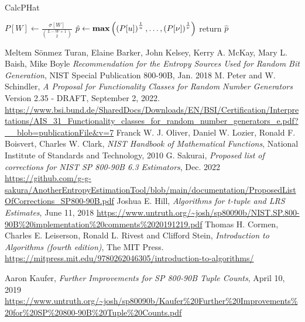 ﻿\documentclass[a3paper,xelatex,english]{bxjsarticle}
\newcommand\mib[1]{\boldsymbol{#1}}
\begin{document}
\begin{algorithm}
  \caption{CalcPHat}\label{alg:CalcPHat}
  \begin{algorithmic}[1]
    \Function{CalcPHat}{$\mib{\sigma}, u, \nu$}
			\State $\displaystyle P[W] \gets \frac{ \sigma[W] }{ \binom{L - W + 1}{2} }$
		\EndFor
		\State $\displaystyle \hat{p} \gets \textrm{\textbf{max}} \left( \left( P[u] \right)^{\frac{1}{u}}, \ldots, \left( P[\nu] \right)^{\frac{1}{\nu}} \right) $
		\State return $\hat{p}$
    \EndFunction
  \end{algorithmic}
\end{algorithm}


\clearpage
\setcounter{section}{3}
\begin{thebibliography}{99}
Meltem S\"{o}nmez Turan,
Elaine Barker,
John Kelsey,
Kerry A. McKay,
Mary L. Baish,
Mike Boyle
\textit{Recommendation for the Entropy Sources Used for Random Bit Generation},
NIST Special Publication 800-90B, Jan. 2018
M. Peter and W. Schindler,
\textit{A Proposal for Functionality Classes for Random Number Generators}
Version 2.35 - DRAFT,
September 2, 2022.
\url{https://www.bsi.bund.de/SharedDocs/Downloads/EN/BSI/Certification/Interpretations/AIS_31_Functionality_classes_for_random_number_generators_e.pdf?__blob=publicationFile&v=7}
Franck W. J. Oliver,
Daniel W. Lozier,
Ronald F. Boisvert,
Charles W. Clark,
\textit{NIST Handbook of Mathematical Functions},
National Institute of Standards and Technology, 2010
G. Sakurai, \textit{Proposed list of corrections for NIST SP 800-90B 6.3 Estimators}, Dec. 2022
\url{https://github.com/g-g-sakura/AnotherEntropyEstimationTool/blob/main/documentation/ProposedListOfCorrections_SP800-90B.pdf}
Joshua E. Hill, \textit{Algorithms for t-tuple and LRS Estimates}, June 11, 2018
\url{https://www.untruth.org/~josh/sp80090b/NIST.SP.800-90B%20implementation%20comments%2020191219.pdf}
Thomas H. Cormen, Charles E. Leiserson, Ronald L. Rivest and Clifford Stein, \textit{Introduction to Algorithms (fourth edition)}, The MIT Press.
\url{https://mitpress.mit.edu/9780262046305/introduction-to-algorithms/}

Aaron Kaufer, \textit{Further Improvements for SP 800-90B Tuple Counts}, April 10, 2019
\url{https://www.untruth.org/~josh/sp80090b/Kaufer%20Further%20Improvements%20for%20SP%20800-90B%20Tuple%20Counts.pdf}
\end{thebibliography}
\end{document}
